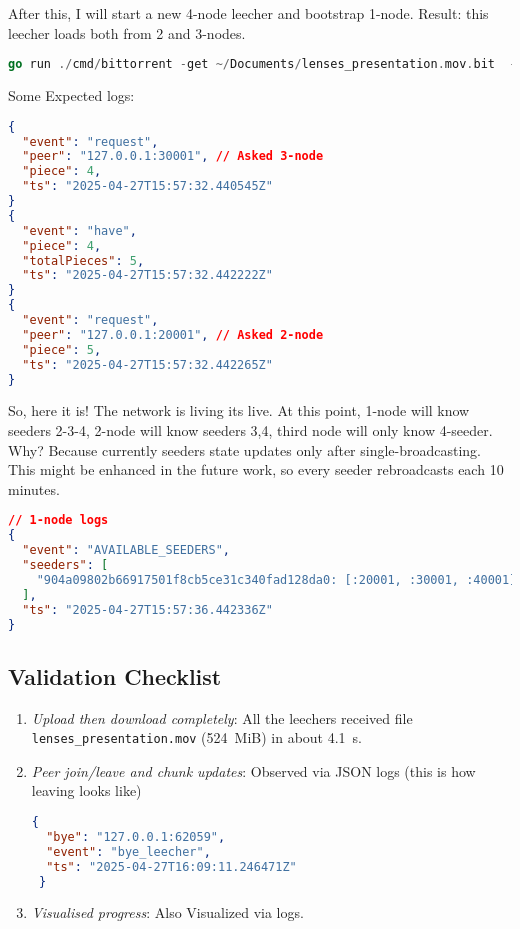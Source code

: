 \documentclass[11pt,a4paper]{article}
\begin{document}
After this, I will start a new 4-node leecher and bootstrap 1-node.
Result: this leecher loads both from 2 and 3-nodes.
\begin{lstlisting}[language=go]
  go run ./cmd/bittorrent -get ~/Documents/lenses_presentation.mov.bit  -bootstrap :10000 -dht-listen :40000  -tcp-listen :40001 -keep 1200 | jq .
\end{lstlisting}

\newpage
Some Expected logs:
\begin{lstlisting}[language=json]
{
  "event": "request",
  "peer": "127.0.0.1:30001", // Asked 3-node
  "piece": 4,
  "ts": "2025-04-27T15:57:32.440545Z"
}
{
  "event": "have",
  "piece": 4,
  "totalPieces": 5,
  "ts": "2025-04-27T15:57:32.442222Z"
}
{
  "event": "request",
  "peer": "127.0.0.1:20001", // Asked 2-node
  "piece": 5,
  "ts": "2025-04-27T15:57:32.442265Z"
}
\end{lstlisting}

So, here it is! The network is living its live. At this point, 1-node will know seeders 2-3-4, 2-node will know seeders 3,4, third node will only know 4-seeder.
Why? Because currently seeders state updates only after single-broadcasting. This might be enhanced in the future work, so every seeder rebroadcasts each 10 minutes.
\begin{lstlisting}[language=json]
// 1-node logs
{
  "event": "AVAILABLE_SEEDERS",
  "seeders": [
    "904a09802b66917501f8cb5ce31c340fad128da0: [:20001, :30001, :40001]"
  ],
  "ts": "2025-04-27T15:57:36.442336Z"
}
\end{lstlisting}


\subsection{Validation Checklist}
\begin{enumerate}
  \item \emph{Upload then download completely}: All the leechers received file \texttt{lenses\_presentation.mov} (524~MiB) in about 4.1~s.  
  \item \emph{Peer join/leave and chunk updates}: Observed via JSON logs (this is how leaving looks like) \begin{lstlisting}[language=json]
 {
  "bye": "127.0.0.1:62059",
  "event": "bye_leecher",
  "ts": "2025-04-27T16:09:11.246471Z"
 }
  \end{lstlisting}
  \item \emph{Visualised progress}: Also Visualized via logs.
\end{enumerate}
\end{document}
